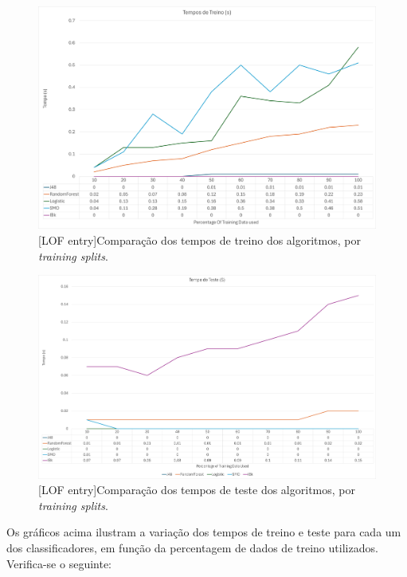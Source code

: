 \documentclass{easychair}
\begin{document}
\begin{figure}[H]
    \begin{centering}
    \includegraphics[width=1\linewidth]{imagens/figure38.jpg}\label{cap-5-fig38}
    [LOF entry]{Comparação dos tempos de treino dos algoritmos, por \textit{training splits}.}
    \label{fig38}
    \end{centering}
\end{figure}

\begin{figure}[H]
    \begin{centering}
    \includegraphics[width=1\linewidth]{imagens/figure39.jpg}\label{cap-5-fig39}
    [LOF entry]{Comparação dos tempos de teste dos algoritmos, por \textit{training splits}.}
    \label{fig39}
    \end{centering}
\end{figure}

Os gráficos acima ilustram a variação dos tempos de treino e teste para cada um dos classificadores, em função da percentagem de dados de treino utilizados. Verifica-se o seguinte:
\end{document}
